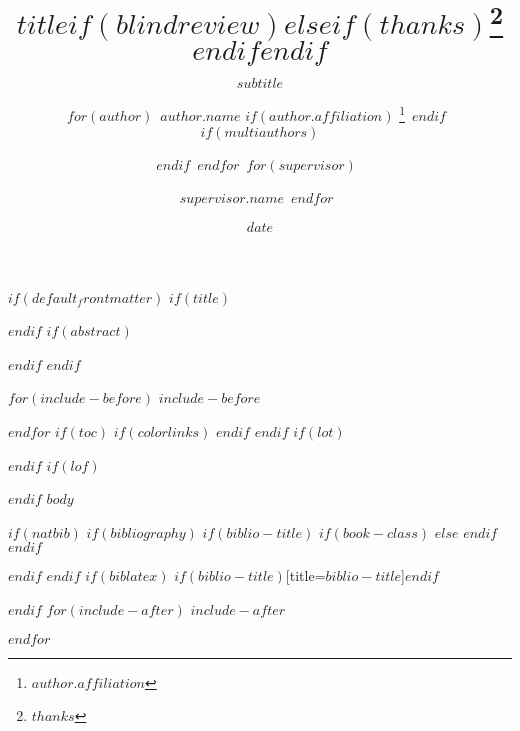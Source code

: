 \documentclass[$if(numbers)$numbers=$numbers$,$endif$$if(fontsize)$$fontsize$,$endif$$if(lang)$$babel-lang$,$endif$$if(papersize)$$papersize$paper,$endif$$for(classoption)$$classoption$$sep$,$endfor$]{$documentclass$}
\title{$title$$if(blindreview)$$else$$if(thanks)$\thanks{$thanks$}$endif$$endif$}
\subtitle{$subtitle$\vspace{1.8cm}}
\author{
      $for(author)$\
      $author.name$
      $if(author.affiliation)$
        \thanks{$author.affiliation$}\
      $endif$\
      $if(multiauthors)$ \and $endif$\
      $endfor$\
      $for(supervisor)$\
        \and $supervisor.name$\
      $endfor$\
    }
\date{$date$}
\begin{document}
$if(default_frontmatter)$
$if(title)$
\maketitle
$endif$
$if(abstract)$
\begin{abstract-flushleft}

$if(keywords)$
\\
\smallskip
\\
$for(keywords)$$keywords$$sep$ \and $endfor$
$endif$
\end{abstract-flushleft}
$endif$
$endif$

\newpage

$for(include-before)$
$include-before$

$endfor$
$if(toc)$
{
$if(colorlinks)$
\hypersetup{linkcolor=$if(toccolor)$$toccolor$$else$black$endif$}
$endif$
\setcounter{tocdepth}{$toc-depth$}
\tableofcontents
}
$endif$
$if(lot)$
\listoftables
$endif$
$if(lof)$
\listoffigures
$endif$
$body$

$if(natbib)$
$if(bibliography)$
$if(biblio-title)$
$if(book-class)$
\renewcommand\bibname{$biblio-title$}
$else$
\renewcommand\refname{$biblio-title$}
$endif$
$endif$


$endif$
$endif$
$if(biblatex)$
\printbibliography$if(biblio-title)$[title=$biblio-title$]$endif$

$endif$
$for(include-after)$
$include-after$

$endfor$
\end{document}
